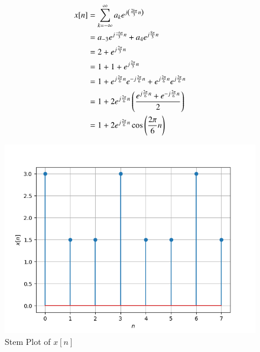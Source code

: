 \documentclass[journal,12pt,twocolumn]{IEEEtran}
\theoremstyle{remark}
\begin{document}
\begin{align}
x[n] &= \sum_{k=-\infty}^{\infty}a_ke^{j\left(\frac{2k\pi}{3}n\right)} \\
&= a_{-3}e^{j\frac{-6\pi}{3}n} + a_{4}e^{j\frac{8\pi}{3}n}  \\
&= 2 + e^{j\frac{2\pi}{3}n}\\
&= 1+1+e^{j\frac{2\pi}{3}n}\\
&= 1+e^{j\frac{2\pi}{6}n}e^{-j\frac{2\pi}{6}n}+e^{j\frac{2\pi}{6}n}e^{j\frac{2\pi}{6}n}\\
&= 1+2e^{j\frac{2\pi}{6}n}\left(\frac{e^{j\frac{2\pi}{6}n}+e^{-j\frac{2\pi}{6}n}}{2}\right) \\
&= 1+2e^{j\frac{2\pi}{6}n}\cos{\ensuremath{\left(\frac{2\pi}{6}n\right)}}
\end{align}
\begin{figure}[htbp]
	\includegraphics[width=\columnwidth]{figs/plot.png}
	\caption{Stem Plot of $x[n]$}
	\label{fig:plot_ee49}
\end{figure}
\end{document}
